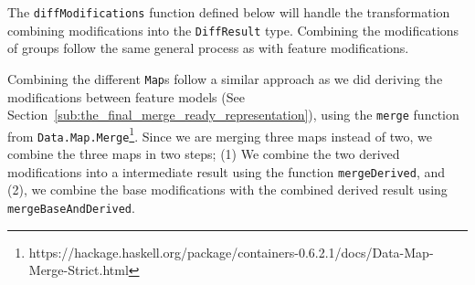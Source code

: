 \documentclass[a4paper,english]{ifimaster}
\begin{document}
The \texttt{diffModifications} function defined below will handle the transformation combining modifications into the \texttt{DiffResult} type. Combining the modifications of groups follow the same general process as with feature modifications. 

Combining the different \texttt{Map}s follow a similar approach as we did deriving the modifications between feature models (See Section~\vref{sub:the_final_merge_ready_representation}), using the \texttt{merge} function from \texttt{Data.Map.Merge}\footnote{https://hackage.haskell.org/package/containers-0.6.2.1/docs/Data-Map-Merge-Strict.html}. Since we are merging three maps instead of two, we combine the three maps in two steps; (1) We combine the two derived modifications into a intermediate result using the function \texttt{mergeDerived}, and (2), we combine the base modifications with the combined derived result using \texttt{mergeBaseAndDerived}.
\end{document}
